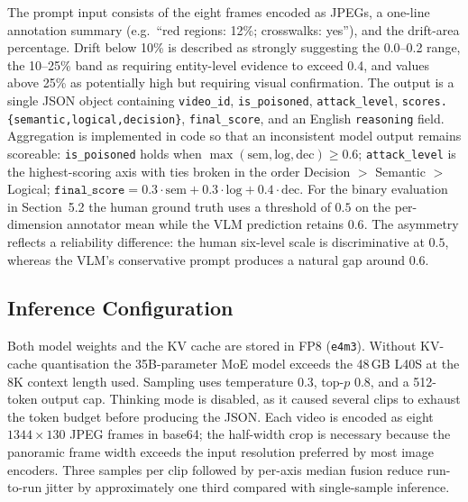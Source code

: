 \documentclass[letterpaper]{article}
\begin{document}
The prompt input consists of the eight frames encoded as JPEGs, a
one-line annotation summary (e.g.\ ``red regions: 12\%; crosswalks:
yes''), and the drift-area percentage. Drift below 10\% is described
as strongly suggesting the 0.0--0.2 range, the 10--25\% band as
requiring entity-level evidence to exceed 0.4, and values above 25\%
as potentially high but requiring visual confirmation. The output is
a single JSON object containing \texttt{video\_id},
\texttt{is\_poisoned}, \texttt{attack\_level},
\texttt{scores.\{semantic,logical,decision\}}, \texttt{final\_score},
and an English \texttt{reasoning} field. Aggregation is implemented
in code so that an inconsistent model output remains scoreable:
\texttt{is\_poisoned} holds when $\max(\text{sem},\text{log},\text{dec})\!\ge\!0.6$;
\texttt{attack\_level} is the highest-scoring axis with ties broken
in the order Decision $>$ Semantic $>$ Logical;
$\texttt{final\_score}=0.3\!\cdot\!\text{sem}+0.3\!\cdot\!\text{log}+0.4\!\cdot\!\text{dec}$.
For the binary evaluation in Section~5.2 the human ground truth uses a
threshold of $0.5$ on the per-dimension annotator mean while the VLM
prediction retains $0.6$. The asymmetry reflects a reliability
difference: the human six-level scale is discriminative at $0.5$,
whereas the VLM's conservative prompt produces a natural gap around
$0.6$.

\subsection{Inference Configuration}
Both model weights and the KV cache are stored in FP8 (\texttt{e4m3}).
Without KV-cache quantisation the 35B-parameter MoE model exceeds the
48\,GB L40S at the 8K context length used. Sampling uses temperature
0.3, top-$p$ 0.8, and a 512-token output cap. Thinking mode is
disabled, as it caused several clips to exhaust the token budget
before producing the JSON. Each video is encoded as eight
$1344\!\times\!130$ JPEG frames in base64; the half-width crop is
necessary because the panoramic frame width exceeds the input
resolution preferred by most image encoders. Three samples per clip
followed by per-axis median fusion reduce run-to-run jitter by
approximately one third compared with single-sample inference.
\end{document}
